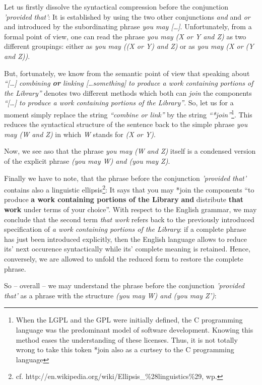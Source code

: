 Let us firstly dissolve the syntactical compression before the conjunction
\emph{'provided that'}: It is established by using the two other conjunctions
\emph{and} and \emph{or} and introduced by the subordinating phrase \emph{you
may [\ldots]}. Unfortunately, from a formal point of view, one can read the
phrase \emph{you may (X or Y and Z)} as two different groupings: either as \emph{you
may ((X or Y) and Z)} or as \emph{you may (X or (Y and Z))}.

But, fortunately, we know from the semantic point of view that speaking about
\emph{\enquote{[\ldots] combining \textbf{or} linking [\ldots something] to
produce a work containing portions of the Library}} denotes two different
methods which both can \emph{join} the components \emph{\enquote{[\ldots] to
produce a work containing portions of the Library}}. So, let us for a moment
simply replace the string \emph{\enquote{combine or link}} by the string
\emph{\enquote{*join}}\footnote{When the LGPL and the GPL were initially
defined, the C programming language was the predominant model of software
development. Knowing this method eases the understanding of these licenses.
Thus, it is not totally wrong to take this token *join also as a curtsey to the
C programming language}. This reduces the syntactical structure of the sentence
back to the simple phrase \emph{you may (W and Z)} in which \emph{W} stands for
\emph{(X or Y)}.

Now, we see aso that the phrase \emph{you may (W and Z)} itself is a
condensed version of the explicit phrase \emph{ (you may W) and (you may Z)}.

Finally we have to note, that the phrase before the conjunction \emph{'provided
that'} contains also a linguistic ellipsis\footnote{cf.
http://en.wikipedia.org/wiki/Ellipsis\_\%28linguistics\%29, wp.
}: It says that you may *join the components \enquote{to produce \textbf{a work
containing portions of the Library} \textbf{and} distribute \textbf{that work}
under terms of your choice}. With respect to the English grammar, we may
conclude that the second term \emph{that work} refers back to the previously
introduced specification of \emph{a work containing portions of the Library}: if
a complete phrase has just been introduced explicitly, then the English language
allows to reduce its' next occurence syntactically while its' complete meaning
is retained. Hence, conversely, we are allowed to unfold the reduced form to
restore the complete phrase.

So -- overall -- we may understand the phrase before the conjunction
\emph{'provided that'} as a phrase with the structure \emph{(you may W) and (you
may Z')}:

